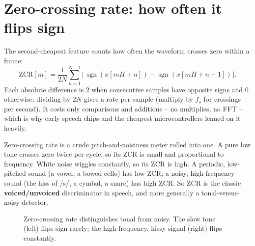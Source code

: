 \section{Zero-crossing rate: how often it flips sign}
\label{ch27:zcr}

The second-cheapest feature counts how often the waveform crosses zero within a
frame:
\begin{equation}
\label{ch27:zcr-defn}
\text{ZCR}[m] = \frac{1}{2N}\sum_{n=1}^{N-1}
  \bigl|\,\operatorname{sgn}(x[mH+n]) - \operatorname{sgn}(x[mH+n-1])\,\bigr|.
\end{equation}
Each absolute difference is $2$ when consecutive samples have opposite signs and $0$ otherwise;
dividing by $2N$ gives a rate per sample (multiply by $f_s$ for crossings per
second). It costs only comparisons and additions -- no multiplies, no FFT -- which
is why early speech chips and the cheapest microcontrollers leaned on it heavily.

\begin{intuitionbox}
Zero-crossing rate is a crude pitch-and-noisiness meter rolled into one. A pure
low tone crosses zero twice per cycle, so its ZCR is small and proportional to
frequency. White noise wiggles constantly, so its ZCR is high. A periodic,
low-pitched sound (a vowel, a bowed cello) has low ZCR; a noisy, high-frequency
sound (the hiss of /s/, a cymbal, a snare) has high ZCR. So ZCR is the classic
\textbf{voiced/unvoiced} discriminator in speech, and more generally a
tonal-versus-noisy detector.
\end{intuitionbox}

\begin{figure}[H]
\centering
{}
\hspace{0.4cm}
\caption{Zero-crossing rate distinguishes tonal from noisy. The slow tone (left)
flips sign rarely; the high-frequency, hissy signal (right) flips constantly.}
\label{ch27:fig-zcr}
\end{figure}

